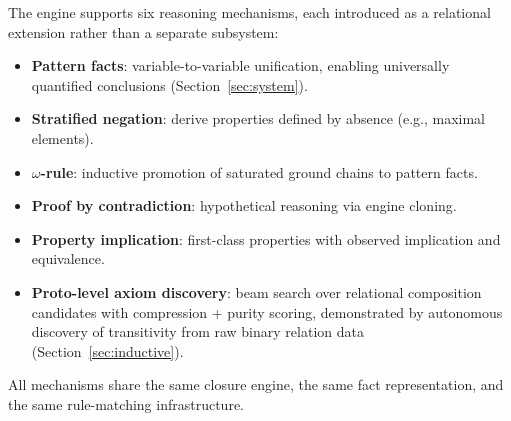 The engine supports six reasoning mechanisms, each introduced as a relational extension rather than a separate subsystem:

\begin{itemize}
\item \textbf{Pattern facts}: variable-to-variable unification, enabling universally quantified conclusions (Section~\ref{sec:system}).
\item \textbf{Stratified negation}: derive properties defined by absence (e.g., maximal elements).
\item \textbf{$\omega$-rule}: inductive promotion of saturated ground chains to pattern facts.
\item \textbf{Proof by contradiction}: hypothetical reasoning via engine cloning.
\item \textbf{Property implication}: first-class properties with observed implication and equivalence.
\item \textbf{Proto-level axiom discovery}: beam search over relational composition candidates with compression + purity scoring, demonstrated by autonomous discovery of transitivity from raw binary relation data (Section~\ref{sec:inductive}).
\end{itemize}

All mechanisms share the same closure engine, the same fact representation, and the same rule-matching infrastructure.
